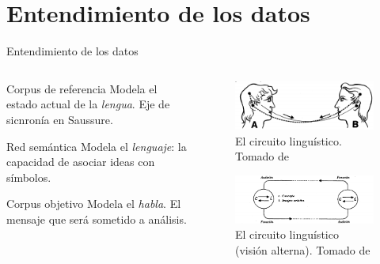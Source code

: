 \documentclass[presentation]{beamer}
\begin{document}
\section{Entendimiento de los datos}
\label{sec:org5a4e7ef}
\begin{frame}[label={sec:orgc3c9f64}]{Entendimiento de los datos}
\begin{columns}
\begin{column}{0.48\columnwidth}
\begin{block}{Corpus de referencia}
Modela el estado actual de la \emph{lengua}.
Eje de sicnronía en Saussure.
\end{block}

\begin{block}{Red semántica}
 Modela el \emph{lenguaje}: la capacidad de asociar ideas con símbolos.
\end{block}

\begin{block}{Corpus objetivo}
 Modela el \emph{habla}. El mensaje que será sometido a análisis.
\end{block}
\end{column}



\begin{column}{0.48\columnwidth}
\begin{figure}
\includegraphics[width=\textwidth]{./assets/sistema-comunicacion.png}
\caption{El circuito linguístico. Tomado de \cite{alonso1945curso}}
\end{figure}

   \begin{figure}

   \includegraphics[width=\textwidth]{./assets/sistema-comunicacion2.png}
\caption{El circuito linguístico (visión alterna). Tomado de \cite{alonso1945curso}}
   \end{figure}
\end{column}
\end{columns}
\end{frame}
\end{document}
